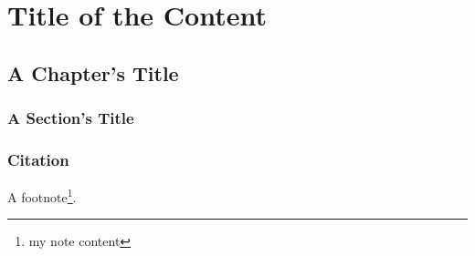 \documentclass[../report]{subfiles}
\begin{document}
\part[Content's Title]{Title of the Content}
\lipsum[1]

\chapter{A Chapter's Title}

\section{A Section's Title}

\section{Citation}

A footnote\footnote{my note content}.
\end{document}
